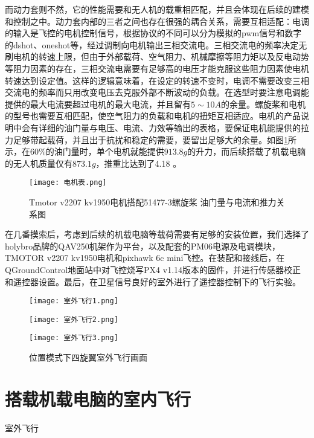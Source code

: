 而动力套则不然，它的性能需要和无人机的载重相匹配，并且会体现在后续的建模和控制之中。动力套内部的三者之间也存在很强的耦合关系，需要互相适配：电调的输入是飞控的电机控制信号，根据协议的不同可以分为模拟的pwm信号和数字的dshot、oneshot等，经过调制向电机输出三相交流电。三相交流电的频率决定无刷电机的转速上限，但由于外部载荷、空气阻力、机械摩擦等阻力矩以及反电动势等阻力因素的存在，三相交流电需要有足够高的电压才能克服这些阻力因素使电机转速达到设定值。这样的逻辑意味着，在设定的转速不变时，电调不需要改变三相交流电的频率而只用改变电压去克服外部不断波动的负载。在选型时要注意电调能提供的最大电流要超过电机的最大电流，并且留有$5\sim 10A$的余量。螺旋桨和电机的型号也需要互相匹配，使空气阻力的负载和电机的扭矩互相适应。电机的产品说明中会有详细的油门量与电压、电流、力效等输出的表格，要保证电机能提供的拉力足够带起载荷，并且出于抗扰和稳定的需要，要留出足够大的余量。如图\ref{电机表}所示，在$60 \%$的油门量时，单个电机就能提供$913.8g$的升力，而后续搭载了机载电脑的无人机质量仅有$873.1g$，推重比达到了4.18 。
\begin{figure}[!h]
  \centering
  \texttt{[image: 电机表.png]}
  \caption{Tmotor v2207 kv1950电机搭配51477-3螺旋桨 油门量与电流和推力关系图\cite{Tmotor2023}}
  \label{电机表}
\end{figure}

在几番摸索后，考虑到后续的机载电脑等载荷需要有足够的安装位置，我们选择了holybro品牌的QAV250机架作为平台，以及配套的PM06电源及电调模块，TMOTOR v2207 kv1950电机和pixhawk 6c mini飞控。在装配和接线后，在QGroundControl地面站中对飞控烧写PX4 v1.14版本的固件，并进行传感器校正和遥控器设置。最后，在卫星信号良好的室外进行了遥控器控制下的飞行实验。

\begin{figure}[h]
  \centering
  \begin{minipage}[c]{0.33\textwidth}
    \centering
    \texttt{[image: 室外飞行1.png]}
  \end{minipage} \hfill
  \begin{minipage}[c]{0.33\textwidth}
    \centering
    \texttt{[image: 室外飞行2.png]}
  \end{minipage}\hfill
    \begin{minipage}[c]{0.33\textwidth}
      \centering
      \texttt{[image: 室外飞行3.png]}
  \end{minipage}
  \caption{位置模式下四旋翼室外飞行画面}
  \end{figure}

  \section{搭载机载电脑的室内飞行}
室外飞行
